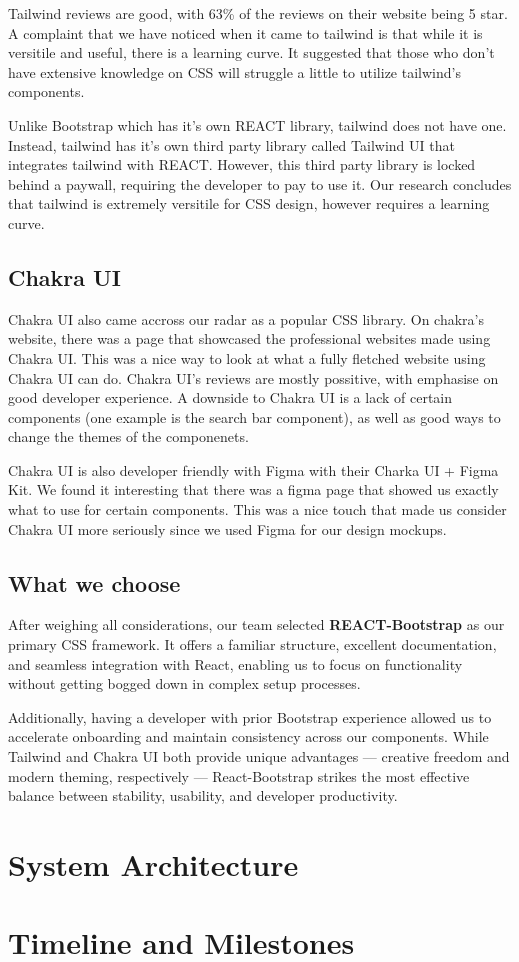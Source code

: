 \documentclass[12pt]{article}
\begin{document}
Tailwind reviews are good, with 63\% of the reviews on their website being 5 star.
A complaint that we have noticed when it came to tailwind is that while it is versitile and useful, there is a learning curve.
It suggested that those who don't have extensive knowledge on CSS will struggle a little to utilize tailwind's components.

Unlike Bootstrap which has it's own REACT library, tailwind does not have one.
Instead, tailwind has it's own third party library called Tailwind UI that integrates tailwind with REACT.
However, this third party library is locked behind a paywall, requiring the developer to pay to use it.
Our research concludes that tailwind is extremely versitile for CSS design, however requires a learning curve.


\subsection{Chakra UI}
Chakra UI also came accross our radar as a popular CSS library.
On chakra's website, there was a page that showcased the professional websites made using Chakra UI. 
This was a nice way to look at what a fully fletched website using Chakra UI can do.
Chakra UI's reviews are mostly possitive, with emphasise on good developer experience.
A downside to Chakra UI is a lack of certain components (one example is the search bar component), as well
as good ways to change the themes of the componenets.

Chakra UI is also developer friendly with Figma with their Charka UI + Figma Kit. 
We found it interesting that there was a figma page that showed us exactly what to use for certain components.
This was a nice touch that made us consider Chakra UI more seriously since we used Figma for our design mockups.

\subsection{What we choose}
After weighing all considerations, our team selected \textbf{REACT-Bootstrap} as our primary CSS framework. 
It offers a familiar structure, excellent documentation, and seamless integration with React, 
enabling us to focus on functionality without getting bogged down in complex setup processes.

Additionally, having a developer with prior Bootstrap experience allowed us to accelerate onboarding 
and maintain consistency across our components.
While Tailwind and Chakra UI both provide unique advantages — creative freedom and modern theming, 
respectively — React-Bootstrap strikes the most effective balance between stability, usability, and developer productivity.


\section{System Architecture}

\section{Timeline and Milestones}
\end{document}
